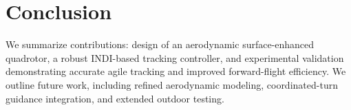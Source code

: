 
\chapter{Conclusion}\label{chapter:conclusion}

We summarize contributions: design of an aerodynamic surface-enhanced quadrotor, a robust INDI-based tracking controller, and experimental validation demonstrating accurate agile tracking and improved forward-flight efficiency. We outline future work, including refined aerodynamic modeling, coordinated-turn guidance integration, and extended outdoor testing.
